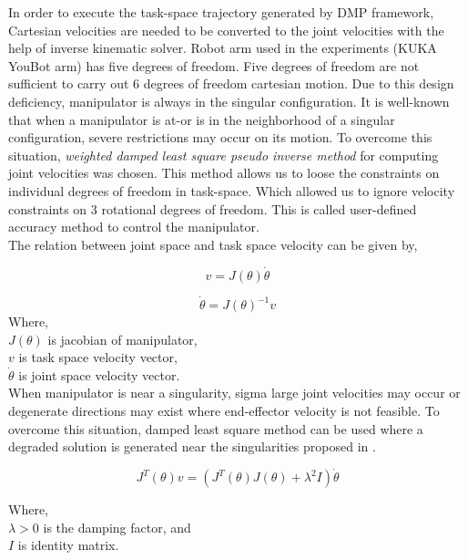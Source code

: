 In order to execute the task-space trajectory generated by DMP framework, Cartesian velocities are needed to be converted to the joint velocities with the help of inverse kinematic solver. Robot arm used in the experiments (KUKA YouBot arm) has five degrees of freedom. Five degrees of freedom are not sufficient to carry out 6 degrees of freedom cartesian motion. Due to this design deficiency, manipulator is always in the singular configuration. It is well-known that when a manipulator is at-or is in the neighborhood of a singular configuration, severe restrictions may occur on its motion. To overcome this situation, \textit{weighted damped least square pseudo inverse method} for computing joint velocities was chosen. This method allows us to loose the constraints on individual degrees of freedom in task-space. Which allowed us to ignore velocity constraints on 3 rotational degrees of freedom. This is called user-defined accuracy method to control the manipulator. \cite{chiaverini1994review}
\\
The relation between joint space and task space velocity can be given by, 

\begin{equation}\label{theta_dot}
	v = J(\theta) \dot{\theta} 
\end{equation}

\begin{equation}
	\dot{\theta} = J(\theta)^{-1}  v
\end{equation} 
Where, \\
$J(\theta)$ is jacobian of manipulator, \\
$v$ is task space velocity vector, \\
$\dot{\theta}$ is joint space velocity vector. \\

When manipulator is near a singularity, sigma  large joint velocities may occur or degenerate directions may exist where end-effector velocity
is not feasible\cite{chiaverini1994review}. To overcome this situation, damped least square method can be used where a degraded solution is generated near the singularities proposed in \cite{wampler1986manipulator, nakamura1986inverse}.  

\begin{equation}
	J^{T}(\theta)v = (J^{T}(\theta)J(\theta) + \lambda ^{2}I)\dot{\theta}
\end{equation}

Where, \\
$\lambda > 0 $ is the damping factor, and \\
$I $ is identity matrix. \\

